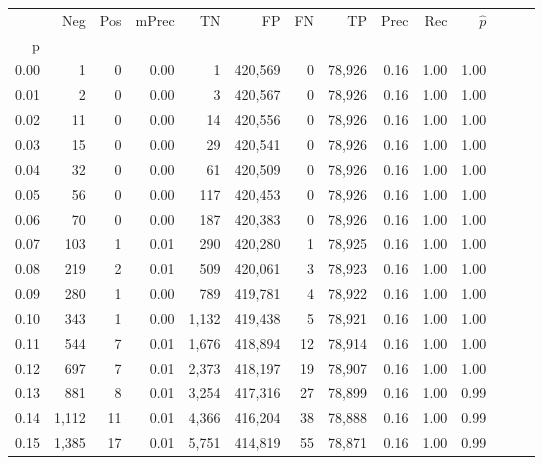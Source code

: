 \begin{tabular}{rrrrrrrrrrrrrr}
\toprule
{} &     Neg &    Pos & mPrec &       TN &       FP &      FN &      TP &  Prec &   Rec & $\hat{p}$ \\
p    &         &        &       &          &          &         &         &       &       &           \\
\midrule
0.00 &       1 &      0 &  0.00 &        1 &  420,569 &       0 &  78,926 &  0.16 &  1.00 &      1.00 \\
0.01 &       2 &      0 &  0.00 &        3 &  420,567 &       0 &  78,926 &  0.16 &  1.00 &      1.00 \\
0.02 &      11 &      0 &  0.00 &       14 &  420,556 &       0 &  78,926 &  0.16 &  1.00 &      1.00 \\
0.03 &      15 &      0 &  0.00 &       29 &  420,541 &       0 &  78,926 &  0.16 &  1.00 &      1.00 \\
0.04 &      32 &      0 &  0.00 &       61 &  420,509 &       0 &  78,926 &  0.16 &  1.00 &      1.00 \\
0.05 &      56 &      0 &  0.00 &      117 &  420,453 &       0 &  78,926 &  0.16 &  1.00 &      1.00 \\
0.06 &      70 &      0 &  0.00 &      187 &  420,383 &       0 &  78,926 &  0.16 &  1.00 &      1.00 \\
0.07 &     103 &      1 &  0.01 &      290 &  420,280 &       1 &  78,925 &  0.16 &  1.00 &      1.00 \\
0.08 &     219 &      2 &  0.01 &      509 &  420,061 &       3 &  78,923 &  0.16 &  1.00 &      1.00 \\
0.09 &     280 &      1 &  0.00 &      789 &  419,781 &       4 &  78,922 &  0.16 &  1.00 &      1.00 \\
0.10 &     343 &      1 &  0.00 &    1,132 &  419,438 &       5 &  78,921 &  0.16 &  1.00 &      1.00 \\
0.11 &     544 &      7 &  0.01 &    1,676 &  418,894 &      12 &  78,914 &  0.16 &  1.00 &      1.00 \\
0.12 &     697 &      7 &  0.01 &    2,373 &  418,197 &      19 &  78,907 &  0.16 &  1.00 &      1.00 \\
0.13 &     881 &      8 &  0.01 &    3,254 &  417,316 &      27 &  78,899 &  0.16 &  1.00 &      0.99 \\
0.14 &   1,112 &     11 &  0.01 &    4,366 &  416,204 &      38 &  78,888 &  0.16 &  1.00 &      0.99 \\
0.15 &   1,385 &     17 &  0.01 &    5,751 &  414,819 &      55 &  78,871 &  0.16 &  1.00 &      0.99 \\

\end{tabular}
